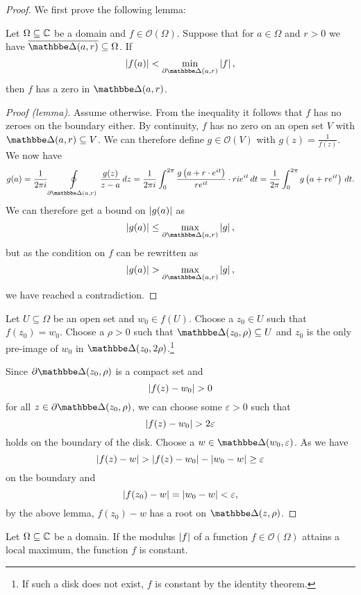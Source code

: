 \begin{proof}
We first prove the following lemma:

\begin{lema*}
Let $\Omega \subseteq \mathbb{C}$ be a domain and
$f \in \mathcal{O}(\Omega)$. Suppose that for $a \in \Omega$ and
$r > 0$ we have $\oline{\dsk(a, r)} \subseteq \Omega$. If
\[
\abs{f(a)} < \min_{\partial \dsk(a, r)} \abs{f},
\]
then $f$ has a zero in $\dsk(a, r)$.
\end{lema*}

\begin{proof}[Proof (lemma)]
Assume otherwise. From the inequality it follows that $f$ has no
zeroes on the boundary either. By continuity, $f$ has no zero on an
open set $V$ with $\dsk(a, r) \subseteq V$. We can therefore define
$g \in \mathcal{O}(V)$ with $g(z) = \frac{1}{f(z)}$. We now have
\[
g(a) =
\frac{1}{2 \pi i}
\olint_{\partial \dsk(a, r)} \frac{g(z)}{z-a}\,dz =
\frac{1}{2 \pi i}
\int_0^{2 \pi}
\frac{g \br{a + r \cdot e^{it}}}{re^{it}} \cdot r i e^{it}\,dt =
\frac{1}{2 \pi} \int_0^{2 \pi}  g \br{a + r e^{it}}\,dt.
\]
We can therefore get a bound on $\left\lvert g(a)\right\rvert$ as
\[
\abs{g(a)} \leq \max_{\partial \dsk(a, r)} \abs{g},
\]
but as the condition on $f$ can be rewritten as
\[
\abs{g(a)} > \max_{\partial \dsk(a, r)} \abs{g},
\]
we have reached a contradiction.
\end{proof}

Let $U \subseteq \Omega$ be an open set and $w_0 \in f(U)$. Choose
a $z_0 \in U$ such that $f(z_0) = w_0$. Choose a $\rho > 0$ such
that $\dsk(z_0, \rho) \subseteq U$ and $z_0$ is the only pre-image
of $w_0$ in $\dsk(z_0, 2\rho)$.\footnote{If such a disk does not
exist, $f$ is constant by the identity theorem.}

Since $\partial \dsk(z_0, \rho)$ is a compact set and
\[
\left\lvert f(z) - w_0\right\rvert > 0
\]
for all $z \in \partial \dsk(z_0, \rho)$, we can choose some
$\varepsilon > 0$ such that
\[
\left\lvert f(z) - w_0\right\rvert > 2 \varepsilon
\]
holds on the boundary of the disk. Choose a
$w \in \dsk(w_0, \varepsilon)$. As we have
\[
\left\lvert f(z) - w\right\rvert >
\left\lvert f(z) - w_0\right\rvert - \left\lvert w_0 - w\right\rvert \geq
\varepsilon
\]
on the boundary and
\[
\left\lvert f(z_0) - w\right\rvert = \left\lvert w_0 - w\right\rvert < \varepsilon,
\]
by the above lemma, $f(z_0) - w$ has a root on $\dsk(z, \rho)$.
\end{proof}

\begin{izrek}
Let $\Omega \subseteq \mathbb{C}$ be a domain. If the modulus $\left\lvert f\right\rvert$ of
a function $f \in \mathcal{O}(\Omega)$ attains a local maximum, the
function $f$ is constant.
\end{izrek}

